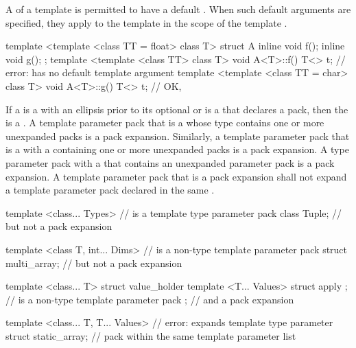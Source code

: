\pnum
A
of a template
is permitted to have a default
.
When such default arguments are specified, they apply to the template
in the scope of the template
.
\begin{example}
\begin{codeblock}
template <template <class TT = float> class T> struct A {
  inline void f();
  inline void g();
};
template <template <class TT> class T> void A<T>::f() {
  T<> t;            // error:  has no default template argument
}
template <template <class TT = char> class T> void A<T>::g() {
  T<> t;            // OK, 
}
\end{codeblock}
\end{example}

\pnum
If a  is a
 with an ellipsis prior to its
optional  or is a
 that declares a
pack, then the 
is a .
A template parameter pack that is a  whose type
contains one or more unexpanded packs is a pack expansion. Similarly,
a template parameter pack that is a  with a
 containing one or more unexpanded
packs is a pack expansion.
A type parameter pack with a  that
contains an unexpanded parameter pack is a pack expansion.
A template parameter pack that is a pack
expansion shall not expand a template parameter pack declared in the same
.
\begin{example}
\begin{codeblock}
template <class... Types>                       //  is a template type parameter pack
   class Tuple;                                 // but not a pack expansion

template <class T, int... Dims>                 //  is a non-type template parameter pack
   struct multi_array;                          // but not a pack expansion

template <class... T>
  struct value_holder {
    template <T... Values> struct apply { };    //  is a non-type template parameter pack
  };                                            // and a pack expansion

template <class... T, T... Values>              // error:  expands template type parameter
  struct static_array;                          // pack  within the same template parameter list
\end{codeblock}
\end{example}

